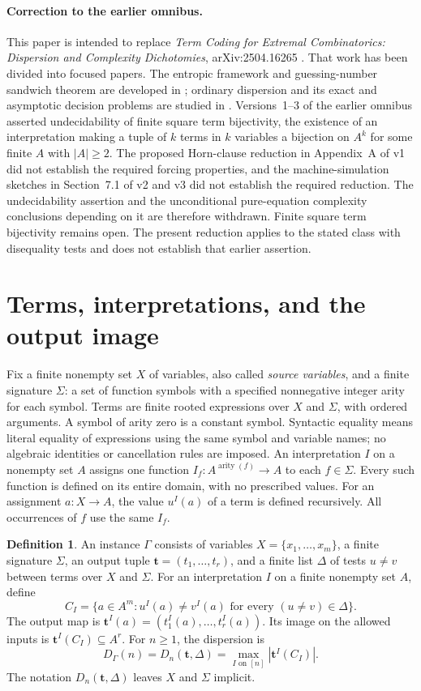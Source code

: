 \documentclass[12pt]{article}
\theoremstyle{definition}
\newtheorem{definition}[theorem]{Definition}
\newcommand{\DD}{D}
\begin{document}
\paragraph{Correction to the earlier omnibus.}
This paper is intended to replace \emph{Term Coding for Extremal
Combinatorics: Dispersion and Complexity Dichotomies}, arXiv:2504.16265
\cite{Omnibus}. That work has been divided into focused papers.
The entropic framework and guessing-number sandwich theorem are developed
in \cite{Paper1}; ordinary dispersion and its exact and asymptotic
decision problems are studied in \cite{Paper2}.
Versions~1--3 of the earlier omnibus asserted undecidability of finite
square term bijectivity, the existence of an interpretation making a
tuple of $k$ terms in $k$ variables a bijection on $A^k$ for some finite
$A$ with $|A|\ge2$. The proposed Horn-clause reduction in Appendix~A
of v1 did not establish the required forcing properties, and the
machine-simulation sketches in Section~7.1 of v2 and v3 did not establish
the required reduction. The undecidability assertion and the unconditional
pure-equation complexity conclusions depending on it are therefore
withdrawn. Finite square term bijectivity remains open. The present
reduction applies to the stated class with disequality tests and does
not establish that earlier assertion.

\section{Terms, interpretations, and the output image}\label{sec:language}
Fix a finite nonempty set $X$ of variables, also called \emph{source
variables}, and a finite signature $\Sigma$: a set of function symbols
with a specified nonnegative integer arity for each symbol. Terms are
finite rooted expressions over $X$ and $\Sigma$, with ordered arguments.
A symbol of arity zero is a constant symbol. Syntactic equality means
literal equality of expressions using the same symbol and variable
names; no algebraic identities or cancellation rules are imposed.
An interpretation $I$ on a nonempty set $A$ assigns one function
$I_f:A^{\operatorname{arity}(f)}\to A$ to each $f\in\Sigma$.
Every such function is defined on its entire domain, with no prescribed
values. For an assignment $a:X\to A$, the value $u^I(a)$ of a term is
defined recursively. All occurrences of $f$ use the same $I_f$.

\begin{definition}
An instance $\Gamma$ consists of variables $X=\{x_1,\ldots,x_m\}$,
a finite signature $\Sigma$, an output tuple
$\mathbf t=(t_1,\ldots,t_r)$, and a finite list $\Delta$ of tests
$u\ne v$ between terms over $X$ and $\Sigma$.
For an interpretation $I$ on a finite nonempty set $A$, define
\[
 C_I=\{a\in A^m:u^I(a)\ne v^I(a)
                    \text{ for every }(u\ne v)\in\Delta\}.
\]
The output map is
$\mathbf t^I(a)=(t_1^I(a),\ldots,t_r^I(a))$.
Its image on the allowed inputs is $\mathbf t^I(C_I)\subseteq A^r$.
For $n\ge1$, the dispersion is
\[
 D_\Gamma(n)=\DD_n(\mathbf t,\Delta)
       =\max_{I\text{ on }[n]}|\mathbf t^I(C_I)|.
\]
The notation $\DD_n(\mathbf t,\Delta)$ leaves $X$ and $\Sigma$ implicit.
\end{definition}
\end{document}
